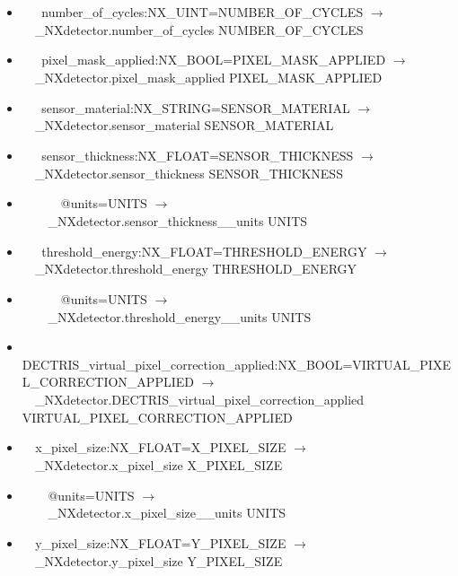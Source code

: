 \documentclass[11pt]{article}
\begin{document}
{{\begin{itemize}
\item{\verb|   |number\_of\_cycles:NX\_UINT=NUMBER\_OF\_CYCLES $\rightarrow$\\
\verb|  |\_NXdetector.number\_of\_cycles NUMBER\_OF\_CYCLES}

\item{\verb|   |pixel\_mask\_applied:NX\_BOOL=PIXEL\_MASK\_APPLIED $\rightarrow$\\
\verb|  |\_NXdetector.pixel\_mask\_applied PIXEL\_MASK\_APPLIED}

\item{\verb|   |sensor\_material:NX\_STRING=SENSOR\_MATERIAL $\rightarrow$\\
\verb|  |\_NXdetector.sensor\_material SENSOR\_MATERIAL}

\item{\verb|   |sensor\_thickness:NX\_FLOAT=SENSOR\_THICKNESS $\rightarrow$\\
\verb|  |\_NXdetector.sensor\_thickness SENSOR\_THICKNESS}

\item{\verb|      |@units=UNITS $\rightarrow$\\
\verb|    |\_NXdetector.sensor\_thickness\_\_units UNITS}

\item{\verb|   |threshold\_energy:NX\_FLOAT=THRESHOLD\_ENERGY $\rightarrow$\\
\verb|  |\_NXdetector.threshold\_energy THRESHOLD\_ENERGY}

\item{\verb|      |@units=UNITS $\rightarrow$\\
\verb|    |\_NXdetector.threshold\_energy\_\_units UNITS}

\item{\verb|  |DECTRIS\_virtual\_pixel\_correction\_applied:NX\_BOOL=VIRTUAL\_PIXEL\_CORRECTION\_APPLIED $\rightarrow$\\
\verb|  |\_NXdetector.DECTRIS\_virtual\_pixel\_correction\_applied VIRTUAL\_PIXEL\_CORRECTION\_APPLIED}

\item{\verb|  |x\_pixel\_size:NX\_FLOAT=X\_PIXEL\_SIZE $\rightarrow$\\
\verb|  |\_NXdetector.x\_pixel\_size X\_PIXEL\_SIZE}

\item{\verb|    |@units=UNITS $\rightarrow$\\
\verb|    |\_NXdetector.x\_pixel\_size\_\_units UNITS}

\item{\verb|  |y\_pixel\_size:NX\_FLOAT=Y\_PIXEL\_SIZE $\rightarrow$\\
\verb|  |\_NXdetector.y\_pixel\_size Y\_PIXEL\_SIZE}


\end{itemize}}}
\end{document}
